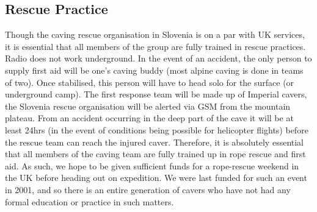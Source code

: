 \subsection{Rescue Practice}

Though the caving rescue organisation in Slovenia is on a par with UK services, it is essential that all members of the group are fully trained in rescue practices. Radio does not work underground. In the event of an accident, the only person to supply first aid will be one's caving buddy (most alpine caving is done in teams of two). Once stabilised, this person will have to head solo for the surface (or underground camp). The first response team will be made up of Imperial cavers, the Slovenia rescue organisation will be alerted via GSM from the mountain plateau. From an accident occurring in the deep part of the cave it will be at least 24hrs (in the event of conditions being possible for helicopter flights) before the rescue team can reach the injured caver. Therefore, it is absolutely essential that all members of the caving team are fully trained up in rope rescue and first aid. As such, we hope to be given sufficient funds for a rope-rescue weekend in the UK before heading out on expedition. We were last funded for such an event in 2001, and so there is an entire generation of cavers who have not had any formal education or practice in such matters.
